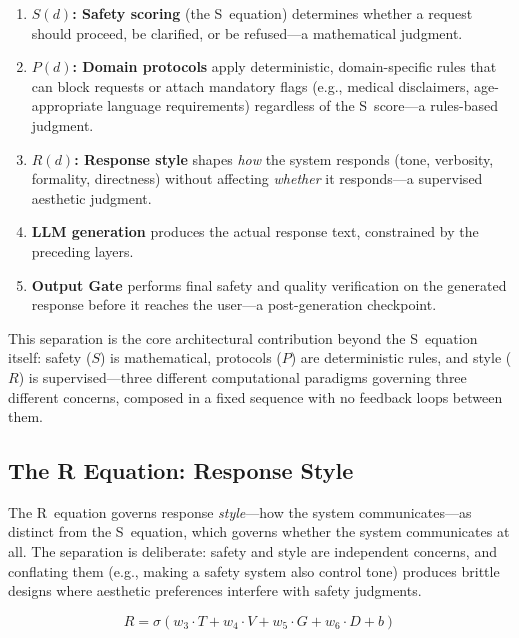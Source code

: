 \documentclass[11pt,a4paper]{article}
\begin{document}
\begin{enumerate}[nosep]
\item \textbf{$S(d)$: Safety scoring} (the S~equation) determines whether a request should proceed, be clarified, or be refused---a mathematical judgment.
\item \textbf{$P(d)$: Domain protocols} apply deterministic, domain-specific rules that can block requests or attach mandatory flags (e.g., medical disclaimers, age-appropriate language requirements) regardless of the S~score---a rules-based judgment.
\item \textbf{$R(d)$: Response style} shapes \emph{how} the system responds (tone, verbosity, formality, directness) without affecting \emph{whether} it responds---a supervised aesthetic judgment.
\item \textbf{LLM generation} produces the actual response text, constrained by the preceding layers.
\item \textbf{Output Gate} performs final safety and quality verification on the generated response before it reaches the user---a post-generation checkpoint.
\end{enumerate}

This separation is the core architectural contribution beyond the S~equation itself: safety ($S$) is mathematical, protocols ($P$) are deterministic rules, and style ($R$) is supervised---three different computational paradigms governing three different concerns, composed in a fixed sequence with no feedback loops between them.


\subsection{The R Equation: Response Style}
\label{sec:r_equation}

The R~equation governs response \emph{style}---how the system communicates---as distinct from the S~equation, which governs whether the system communicates at all. The separation is deliberate: safety and style are independent concerns, and conflating them (e.g., making a safety system also control tone) produces brittle designs where aesthetic preferences interfere with safety judgments.

\begin{equation}
R = \sigma(w_3 \cdot T + w_4 \cdot V + w_5 \cdot G + w_6 \cdot D + b)
\label{eq:r_equation}
\end{equation}
\end{document}
